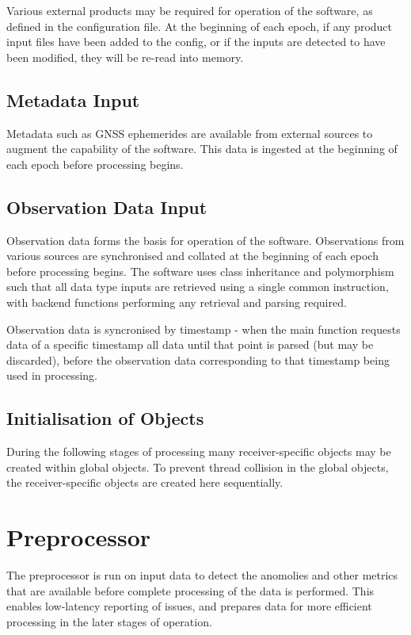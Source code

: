 Various external products may be required for operation of the software, as defined in the configuration file. At the beginning of each epoch, if any product input files have been added to the config, or if the inputs are detected to have been modified, they will be re-read into memory.


\subsection{Metadata Input}

Metadata such as GNSS ephemerides are available from external sources to augment the capability of the software. This data is ingested at the beginning of each epoch before processing begins.


\subsection{Observation Data Input}

Observation data forms the basis for operation of the software. Observations from various sources are synchronised and collated at the beginning of each epoch before processing begins. The software uses class inheritance and polymorphism such that all data type inputs are retrieved using a single common instruction, with backend functions performing any retrieval and parsing required.

Observation data is syncronised by timestamp - when the main function requests data of a specific timestamp all data until that point is parsed (but may be discarded), before the observation data corresponding to that timestamp being used in processing.


\subsection{Initialisation of Objects}

During the following stages of processing many receiver-specific objects may be created within global objects. To prevent thread collision in the global objects, the receiver-specific objects are created here sequentially.


\section{Preprocessor}

The preprocessor is run on input data to detect the anomolies and other metrics that are available before complete processing of the data is performed. This enables low-latency reporting of issues, and prepares data for more efficient processing in the later stages of operation.


